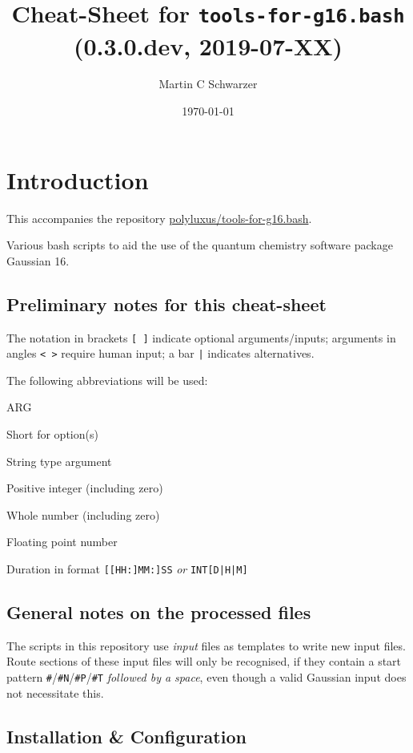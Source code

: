 \documentclass[   %
  final,          %
  a4paper,        %
  rscols=3,       %
  margin=1.0cm,   %
]{refsheet}
\title{Cheat-Sheet for \texttt{tools-for-g16.bash} (0.3.0.dev, 2019-07-XX)}
\author{Martin C Schwarzer}
\date{\today}
\begin{document}
\maketitle

\section{Introduction}

This accompanies the repository \href{https://github.com/polyluxus/tools-for-g16.bash}{polyluxus/tools-for-g16.bash}.

Various bash scripts to aid the use of the quantum chemistry software package Gaussian 16.

\subsection{Preliminary notes for this cheat-sheet}

The notation in brackets \texttt{[ ]} indicate optional arguments/inputs;
arguments in angles \texttt{< >} require human input;
a bar \texttt{|} indicates alternatives.

The following abbreviations will be used:
\begin{rslisttt}{ARG}
  \item[opt] Short for option(s)
  \item[ARG] String type argument
  \item[INT] Positive integer (including zero)
  \item[NUM] Whole number (including zero)
  \item[FLT] Floating point number
  \item[DUR] Duration in format \texttt{[[HH:]MM:]SS} \emph{or} \texttt{INT[D|H|M]}
\end{rslisttt}

\subsection{General notes on the processed files}

The scripts in this repository use \emph{input} files as templates to write new input files.
Route sections of these input files will only be recognised, 
if they contain a start pattern \texttt{\#}/\texttt{\#N}/\texttt{\#P}/\texttt{\#T}
\emph{followed by a space}, even though a valid Gaussian input does not necessitate this.

\subsection{Installation \& Configuration}
\end{document}
